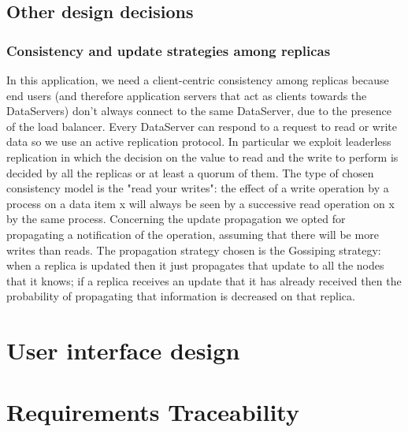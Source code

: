 \documentclass[a4paper]{report}
\begin{document}
\section{Other design decisions}
\subsection{Consistency and update strategies among replicas}
In this application,  we need a client-centric consistency among replicas because end users (and therefore application servers that act as clients towards the DataServers) don't always connect to the same DataServer, due to the presence of the load balancer. Every DataServer can respond to a request to read or write data so we use an active replication protocol. In particular we exploit leaderless replication in which the decision on the value to read and the write to perform is decided by all the replicas or at least a quorum of them. The type of chosen consistency model  is the "read your writes": the effect of a write operation by a process on a data item x will always be seen by a successive read operation on x by the same process. 
Concerning the update propagation we opted for propagating a notification of the operation, assuming that there will be more writes than reads.  The propagation strategy chosen is the Gossiping strategy: when a replica is updated then it just propagates that update to all the nodes that it knows; if a replica receives an update that it has already received then the probability of propagating that information is decreased on that replica. 

\chapter{User interface design}

\chapter{Requirements Traceability}
\end{document}
